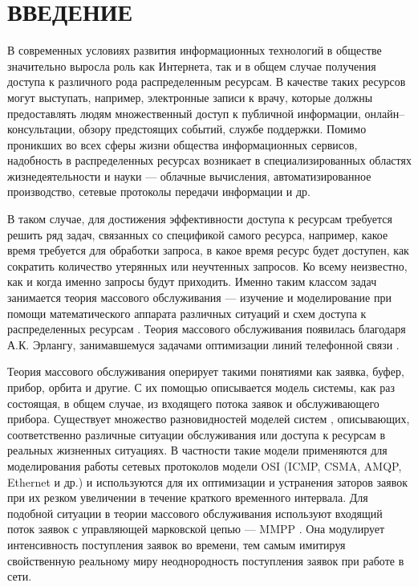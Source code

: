 \section*{ВВЕДЕНИЕ}
В современных условиях развития информационных технологий в обществе значительно выросла роль как Интернета, так и в общем случае получения доступа к различного рода распределенным ресурсам. В качестве таких ресурсов могут выступать, например, электронные записи к врачу, которые должны предоставлять людям множественный доступ к публичной информации, онлайн--консультации, обзору предстоящих событий, службе поддержки. Помимо проникших во всех сферы жизни общества информационных сервисов, надобность в распределенных ресурсах возникает в специализированных областях жизнедеятельности и науки --- облачные вычисления, автоматизированное производство, сетевые протоколы передачи информации и др.

В таком случае, для достижения эффективности доступа к ресурсам требуется решить ряд задач, связанных со спецификой самого ресурса, например, какое время требуется для обработки запроса, в какое время ресурс будет доступен, как сократить количество утерянных или неучтенных запросов. Ко всему неизвестно, как и когда именно запросы будут приходить. Именно таким классом задач занимается теория массового обслуживания --- изучение и моделирование при помощи математического аппарата различных ситуаций и схем доступа к распределенных ресурсам \cite{nazarov2010theory}. Теория массового обслуживания появилась благодаря  А.К. Эрлангу, занимавшемуся задачами оптимизации линий телефонной связи \cite{erlang1909theory}.

Теория массового обслуживания оперирует такими понятиями как заявка, буфер, прибор, орбита и другие. С их помощью описывается модель системы, как раз состоящая, в общем случае, из входящего потока заявок и обслуживающего прибора. Существует множество разновидностей моделей систем \cite{phung2019retrial,artalejo2010accessible}, описывающих, соответственно различные ситуации обслуживания или доступа к ресурсам в реальных жизненных ситуациях. В частности такие модели применяются для моделирования работы сетевых протоколов модели OSI (ICMP, CSMA, AMQP, Ethernet и др.) \cite{bellovin2003icmp,bjornstad2006traffic,kritzinger1986performance,olypher2010computer} и используются для их оптимизации и устранения заторов заявок при их резком увеличении в течение краткого временного интервала. Для подобной ситуации в теории массового обслуживания используют входящий поток заявок с управляющей марковской цепью --- MMPP \cite{baiocchi1993steady,2019asymptotic}. Она модулирует интенсивность поступления заявок во времени, тем самым имитируя свойственную реальному миру неоднородность поступления заявок при работе в сети.
 
